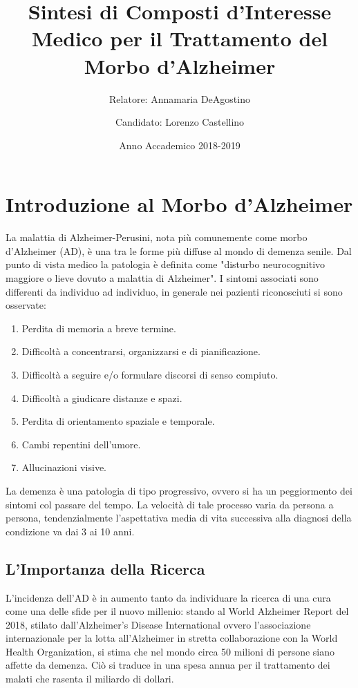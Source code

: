 \documentclass[a4paper, 12pt]{article}
\title{Sintesi di Composti d'Interesse Medico per il Trattamento del Morbo d'Alzheimer}
\author{
	Relatore: Annamaria DeAgostino
	\and
	Candidato: Lorenzo Castellino
}
\date{Anno Accademico 2018-2019}
\begin{document}
\maketitle
\setcounter{page}{0}
\newpage
\tableofcontents
\newpage
{}

\section{Introduzione al Morbo d'Alzheimer}
La malattia di Alzheimer-Perusini, nota più comunemente come morbo d'Alzheimer (AD), è una tra le forme più diffuse al mondo di demenza senile. Dal punto di vista medico la patologia è definita come "disturbo neurocognitivo maggiore o lieve dovuto a malattia di Alzheimer".\cite{american_psychiatric_association_diagnostic_2013}
I sintomi associati sono differenti da individuo ad individuo, in generale nei pazienti riconosciuti si sono osservate:
\begin{enumerate}
	\item Perdita di memoria a breve termine.
	\item Difficoltà a concentrarsi, organizzarsi e di pianificazione.
	\item Difficoltà a seguire e/o formulare discorsi di senso compiuto.
	\item Difficoltà a giudicare distanze e spazi.
	\item Perdita di orientamento spaziale e temporale.
	\item Cambi repentini dell'umore.
	\item Allucinazioni visive.
\end{enumerate}
La demenza è una patologia di tipo progressivo, ovvero si ha un peggiormento dei sintomi col passare del tempo. La velocità di tale processo varia da persona a persona, tendenzialmente l'aspettativa media di vita successiva alla diagnosi della condizione va dai 3 ai 10 anni. \cite{todd_survival_2013}

\subsection{L'Importanza della Ricerca}
L'incidenza dell'AD è in aumento tanto da individuare la ricerca di una cura come una delle sfide per il nuovo millenio: stando al World Alzheimer Report del 2018, stilato dall'Alzheimer's Disease International ovvero l'associazione internazionale per la lotta all'Alzheimer in stretta collaborazione con la World Health Organization, si stima che nel mondo circa 50 milioni di persone siano affette da demenza. Ciò si traduce in una spesa annua per il trattamento dei malati che rasenta il miliardo di dollari.
\end{document}
